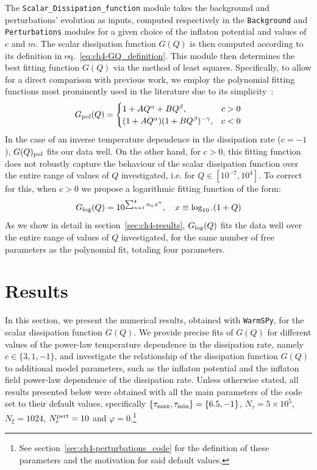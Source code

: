 The \texttt{Scalar\_Dissipation\_function} module takes the background and perturbations' evolution as inputs, computed respectively in the \texttt{Background} and \texttt{Perturbations} modules for a given choice of the inflaton potential and values of $c$ and $m$. The scalar dissipation function $G(Q)$ is then computed according to its definition in eq.~\eqref{eq:ch4-GQ_definition}. This module then determines the best fitting function $G(Q)$ via the method of least squares. Specifically, to allow for a direct comparison with previous work, we employ the polynomial fitting functions most prominently used in the literature due to its simplicity~\cite{Bastero-Gil:2016qru,Benetti:2016jhf,Montefalcone:2022jfw, Motaharfar:2018zyb}:
\begin{equation}
G_{\rm{pol}}(Q)=\begin{cases}
1+AQ^{\alpha}+BQ^{\beta},  & c>0 \\
(1+AQ^{\alpha})(1+BQ^{\beta})^{-\gamma}, & c<0
\end{cases}\label{eq:ch4-GQ_pol} 
\end{equation}
In the case of an inverse temperature
dependence in the dissipation rate ($c=-1$), $G(Q)_{\rm{pol}}$ fits our data well. On the other hand, for $c>0$, this fitting function does not robustly capture the behaviour of the scalar dissipation function over the entire range of values of $Q$ investigated, i.e. for $Q\in [10^{-7}, 10^{4}]$. To correct for this, when $c>0$ we propose a logarithmic fitting function of the form:
\begin{equation}
    G_{\rm{log}}(Q)=10^{\sum_{n=1}^4 a_n x^n}, \quad x\equiv\log_{10}.(1+Q)\label{eq:ch4-GQ_log}
\end{equation}
As we show in detail in section~\ref{sec:ch4-results}, $G_{\rm{log}}(Q)$ fits the data well over the entire range of values of $Q$ investigated, for the same number of free parameters as the polynomial fit, totaling four parameters.

\section{Results \label{sec:ch4-results}}

In this section, we present the numerical results, obtained with \texttt{WarmSPy}, for the scalar dissipation function $G(Q)$. We provide precise fits of $G(Q)$ for different values of the power-law temperature
dependence in the dissipation rate, namely $c\in \{3, 1, -1\}$, and investigate the relationship of the dissipation function $G(Q)$
to additional model parameters, such as the inflaton potential and the inflaton field power-law dependence of the dissipation rate. Unless otherwise stated, all results presented below were obtained with all the main parameters of the code set to their default values, specifically $\{\tau_{\rm{max}},\tau_{\rm{min}}\}=\{6.5,-1\}$, $N_\tau=5\times10^{5}$, $N_\xi=1024$, $N_e^{\rm{pert}}=10$ and $\varphi=0$.\footnote{See section~\ref{sec:ch4-perturbations_code} for the definition of these parameters and the motivation for said default values.}

